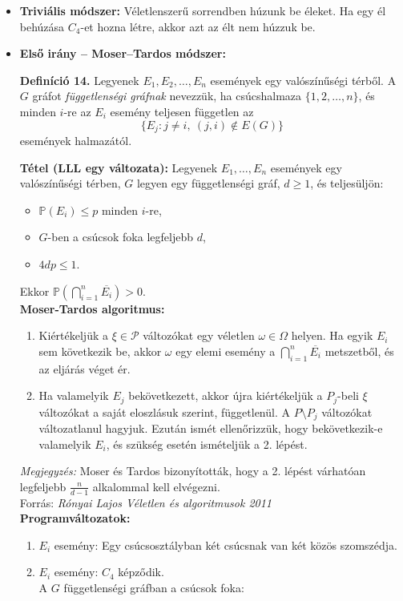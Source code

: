 \documentclass[12pt,a4paper]{article}
\begin{document}
\begin{itemize}
    \item \textbf{Triviális módszer:} Véletlenszerű sorrendben húzunk be éleket. Ha egy él behúzása $C_4$-et hozna létre, akkor azt az élt nem húzzuk be.
    
    \item \textbf{Első irány – Moser–Tardos módszer:} 

    \textbf{Definíció 14.} Legyenek $E_1, E_2, \ldots, E_n$ események egy valószínűségi térből.  
    A $G$ gráfot \emph{függetlenségi gráfnak} nevezzük, ha csúcshalmaza $\{1, 2, \ldots, n\}$, és minden $i$-re az $E_i$ esemény teljesen független az 
    \[
    \{ E_j : j \ne i,\ (j, i) \notin E(G) \}
    \]
    események halmazától.
    
    
    \textbf{Tétel (LLL egy változata):} Legyenek $E_1, \dots, E_n$ események egy valószínűségi térben, $G$ legyen egy függetlenségi gráf, $d \geq 1$, és teljesüljön:
    \begin{itemize}
        \item $\mathbb{P}(E_i) \leq p$ minden $i$-re,
        \item $G$-ben a csúcsok foka legfeljebb $d$,
        \item $4dp \leq 1$.
    \end{itemize}
    Ekkor $\mathbb{P}\left( \bigcap_{i=1}^n \overline{E_i} \right) > 0$.
    \\[2mm]
    \textbf{Moser-Tardos algoritmus:}
    \begin{enumerate}
        \item Kiértékeljük a $\xi \in \mathcal{P}$ változókat egy véletlen $\omega \in \Omega$ helyen. Ha egyik $E_i$ sem következik be, akkor $\omega$ egy elemi esemény a $\bigcap_{i=1}^n \overline{E_i}$ metszetből, és az eljárás véget ér.
        \item Ha valamelyik $E_j$ bekövetkezett, akkor újra kiértékeljük a $P_j$-beli $\xi$ változókat a saját eloszlásuk szerint, függetlenül. A $P \setminus P_j$ változókat változatlanul hagyjuk. Ezután ismét ellenőrizzük, hogy bekövetkezik-e valamelyik $E_i$, és szükség esetén ismételjük a 2. lépést.
    \end{enumerate}

    \textit{Megjegyzés:} Moser és Tardos bizonyították, hogy a 2. lépést várhatóan legfeljebb $\frac{n}{d-1}$ alkalommal kell elvégezni.
    \\[5mm]
    \noindent Forrás: \textit{Rónyai Lajos Véletlen és algoritmusok 2011}
    \\[5mm]
    \textbf{Programváltozatok:}
    \begin{enumerate}
        \item $E_i$ esemény: Egy csúcsosztályban két csúcsnak van két közös szomszédja.
        \item $E_i$ esemény: $C_4$ képződik.\\
        A $G$ függetlenségi gráfban a csúcsok foka:


\end{enumerate}
\end{itemize}
\end{document}
